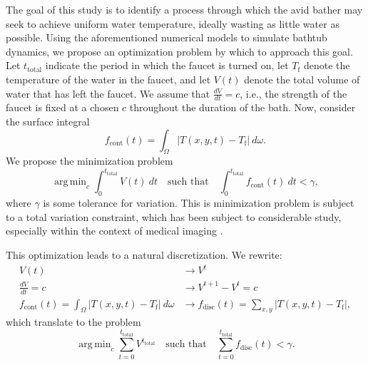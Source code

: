 \documentclass[12pt]{amsart}
\newcommand{\abs}[1]{\left|#1\right|}
\DeclareMathOperator*{\argmin}{\mathrm{arg\,min}}
\begin{document}
The goal of this study is to identify a process through which the avid bather
may seek to achieve uniform water temperature, ideally wasting as little water
as possible. Using the aforementioned numerical models to simulate bathtub
dynamics, we propose an optimization problem by which to approach this goal. Let
$t_{\mathrm{total}}$ indicate the period in which the faucet is turned on, let
$T_{\mathrm{f}}$ denote the temperature of the water in the faucet, and let
$V(t)$ denote the total volume of water that has left the faucet. We assume that
$\frac{dV}{dt} = c$, i.e., the strength of the faucet is fixed at a chosen $c$ throughout the
duration of the bath. Now, consider the surface integral
\begin{equation}
    f_{\mathrm{cont}}(t) = \int_{\Omega} \abs{T(x,y,t) - T_{\mathrm{f}}} \ d\omega.
    \label{eq:\theequation}
\end{equation}
We propose the minimization problem
\begin{equation}
    \argmin_{c} \int_{0}^{t_{\mathrm{total}}} V(t) \ dt \quad \text{such that}
    \quad \int_{0}^{t_{\mathrm{total}}} f_{\mathrm{cont}}(t) \ dt < \gamma,
    \label{eq:\theequation}
\end{equation}
where $\gamma$ is some tolerance for variation. This is minimization
problem is subject to a total variation constraint, which has been subject to
considerable study, especially within the context of medical imaging
\cite{Zhang2005}.

This optimization leads to a natural discretization. We rewrite:
\begin{align}
    V(t) &\longrightarrow V^t \\
    \frac{dV}{dt} = c &\longrightarrow V^{t+1} - V^t = c \\
    f_{\mathrm{cont}}(t) = \int_{\Omega} \abs{T(x,y,t) - T_{\mathrm{f}}} \
    d\omega &\longrightarrow f_{\mathrm{disc}}(t) = \sum_{x,y}\abs{T(x,y,t) -
        T_{\mathrm{f}}},
\end{align}
which translate to the problem
\begin{equation}
    \argmin_{c} \sum_{t=0}^{t_{\mathrm{total}}}V^{t_{\mathrm{total}}} \quad \text{such that} \quad
    \sum_{t=0}^{t_{\mathrm{total}}} f_{\mathrm{disc}}(t) < \gamma.
    \label{eq:\theequation}
\end{equation}
\end{document}
